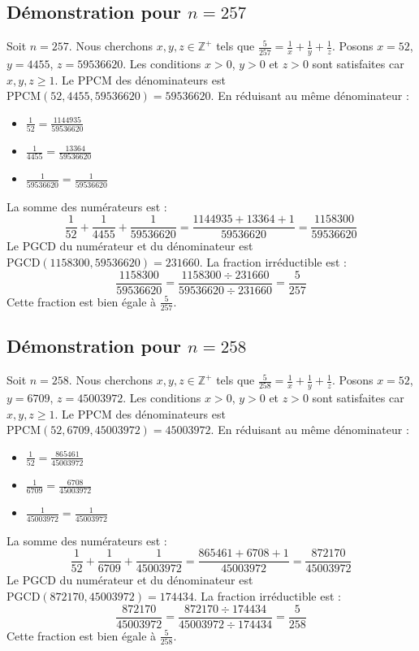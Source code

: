 \documentclass[11pt,a4paper]{article}
\begin{document}
\subsection{Démonstration pour $n = 257$}
Soit $n = 257$. Nous cherchons $x, y, z \in \mathbb{Z}^{+}$ tels que $\frac{5}{257} = \frac{1}{x} + \frac{1}{y} + \frac{1}{z}$.
Posons $x = 52$, $y = 4455$, $z = 59536620$.
Les conditions $x > 0$, $y > 0$ et $z > 0$ sont satisfaites car $x, y, z \geq 1$.
Le PPCM des dénominateurs est $\text{PPCM}(52, 4455, 59536620) = 59536620$.
En réduisant au même dénominateur :
\begin{itemize}
    \item $\frac{1}{52} = \frac{1144935}{59536620}$
    \item $\frac{1}{4455} = \frac{13364}{59536620}$
    \item $\frac{1}{59536620} = \frac{1}{59536620}$
\end{itemize}
La somme des numérateurs est :
$$ \frac{1}{52} + \frac{1}{4455} + \frac{1}{59536620} = \frac{1144935 + 13364 + 1}{59536620} = \frac{1158300}{59536620} $$
Le PGCD du numérateur et du dénominateur est $\text{PGCD}(1158300, 59536620) = 231660$.
La fraction irréductible est :
$$ \frac{1158300}{59536620} = \frac{1158300 \div 231660}{59536620 \div 231660} = \frac{5}{257} $$
Cette fraction est bien égale à $\frac{5}{257}$.

\subsection{Démonstration pour $n = 258$}
Soit $n = 258$. Nous cherchons $x, y, z \in \mathbb{Z}^{+}$ tels que $\frac{5}{258} = \frac{1}{x} + \frac{1}{y} + \frac{1}{z}$.
Posons $x = 52$, $y = 6709$, $z = 45003972$.
Les conditions $x > 0$, $y > 0$ et $z > 0$ sont satisfaites car $x, y, z \geq 1$.
Le PPCM des dénominateurs est $\text{PPCM}(52, 6709, 45003972) = 45003972$.
En réduisant au même dénominateur :
\begin{itemize}
    \item $\frac{1}{52} = \frac{865461}{45003972}$
    \item $\frac{1}{6709} = \frac{6708}{45003972}$
    \item $\frac{1}{45003972} = \frac{1}{45003972}$
\end{itemize}
La somme des numérateurs est :
$$ \frac{1}{52} + \frac{1}{6709} + \frac{1}{45003972} = \frac{865461 + 6708 + 1}{45003972} = \frac{872170}{45003972} $$
Le PGCD du numérateur et du dénominateur est $\text{PGCD}(872170, 45003972) = 174434$.
La fraction irréductible est :
$$ \frac{872170}{45003972} = \frac{872170 \div 174434}{45003972 \div 174434} = \frac{5}{258} $$
Cette fraction est bien égale à $\frac{5}{258}$.
\end{document}
